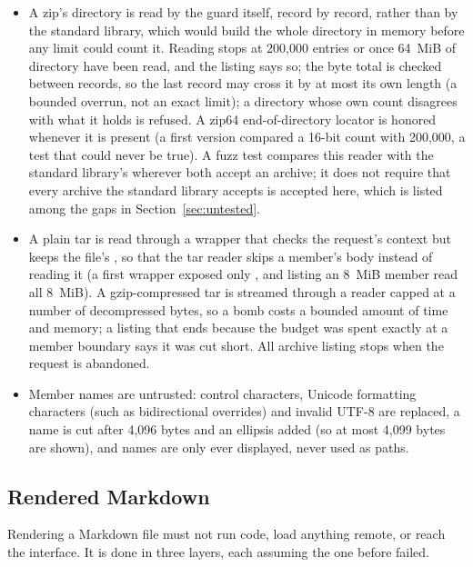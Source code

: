 \begin{itemize}
  \item A zip's directory is read by the guard itself, record by record, rather than by the
        standard library, which would build the whole directory in memory before any limit
        could count it.  Reading stops at 200{,}000 entries or once 64~MiB of directory have been read,
        and the listing says so; the byte total is checked between records, so the last
        record may cross it by at most its own length (a bounded overrun, not an exact
        limit); a directory whose own count disagrees with what it holds is refused.
        A zip64 end-of-directory locator is honored whenever it is present (a first version
        compared a 16-bit count with 200{,}000, a test that could never be true).  A fuzz
        test compares this reader with the standard library's wherever both accept an
        archive; it does not require that every archive the standard library accepts is
        accepted here, which is listed among the gaps in Section~\ref{sec:untested}.
  \item A plain tar is read through a wrapper that checks the request's context but keeps
        the file's , so that the tar reader skips a member's body instead of
        reading it (a first wrapper exposed only , and listing an 8~MiB member
        read all 8~MiB).  A gzip-compressed tar is streamed through a reader capped at a
        number of decompressed bytes, so a bomb costs a bounded amount of time and memory; a
        listing that ends because the budget was spent exactly at a member boundary says it
        was cut short.  All archive listing stops when the request is abandoned.
  \item Member names are untrusted: control characters, Unicode formatting characters (such as
        bidirectional overrides) and invalid UTF-8 are replaced, a name is cut after 4{,}096 bytes
        and an ellipsis added (so at most 4{,}099 bytes are shown), and names are only ever displayed, never used as paths.
\end{itemize}

\subsection{Rendered Markdown}

Rendering a Markdown file must not run code, load anything remote, or reach the interface.
It is done in three layers, each assuming the one before failed.

